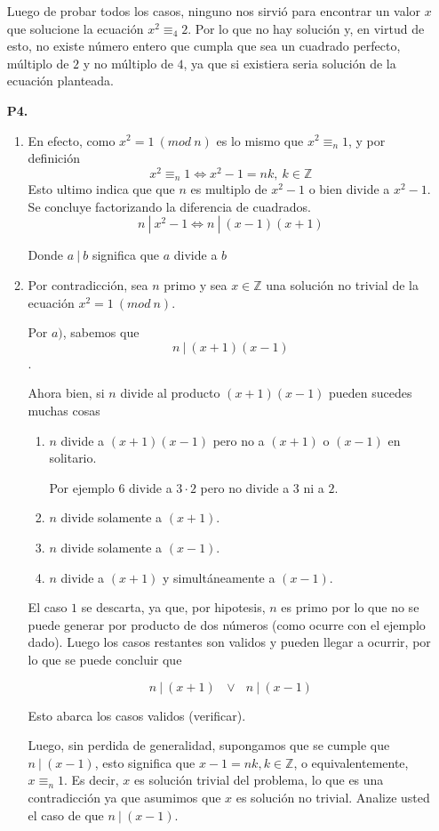\documentclass[letterpaper,11pt]{article}
\newcommand{\Z}{\mathbb Z}
\theoremstyle{plain}
\begin{document}
\begin{enumerate}
Luego de probar todos los casos, ninguno nos sirvió para encontrar un valor $x$ que solucione la ecuación $x^2 \equiv_4 2$. Por lo que no hay solución y, en virtud de esto, no existe número entero que cumpla que sea un cuadrado perfecto, múltiplo de $2$ y no múltiplo de $4$, ya que si existiera seria solución de la ecuación planteada.


\item[\bf P4.] 
\begin{enumerate}
    \item En efecto, como $x^2=1 ~ (mod ~n)$ es lo mismo que $x^2 \equiv_n 1$, y por definición
    $$x^2 \equiv_n 1 \iff x^2-1=nk, ~ k \in \Z$$
    Esto ultimo indica que que $n$ es multiplo de $x^2-1$ o bien divide a $x^2-1$. Se concluye factorizando la diferencia de cuadrados.
    $$n ~|~ x^2-1 \iff n ~|~(x-1)(x+1)$$
     
    Donde $a ~|~ b$ significa que $a$ divide a $b$
     
    \item Por contradicción, sea $n$ primo y sea $x \in \Z$ una solución no trivial de la ecuación $x^2=1 ~ (mod ~n)$. 
    
    Por $a)$, sabemos que $$n ~|~ (x+1)(x-1)$$.
    
    Ahora bien, si $n$ divide al producto $(x+1)(x-1)$ pueden sucedes muchas cosas
    \begin{enumerate}
        \item $n$ divide a $(x+1)(x-1)$ pero no a $(x+1)$ o $(x-1)$ en solitario.
        
        Por ejemplo 6 divide a $3\cdot2$ pero no divide a $3$ ni a $2$.
        \item $n$ divide solamente a $(x+1)$.
        \item $n$ divide solamente a $(x-1)$.
        \item $n$ divide a $(x+1)$ y simultáneamente a $(x-1)$.
    \end{enumerate}
    
    El caso $1$ se descarta, ya que, por hipotesis, $n$ es primo por lo que no se puede generar por producto de dos números (como ocurre con el ejemplo dado). Luego los casos restantes son validos y pueden llegar a ocurrir, por lo que se puede concluir que 
    
    $$ n~ | ~ (x+1) ~~~\lor~~~ n~ | ~ (x-1) $$
    
    Esto abarca los casos validos (verificar).
    
    Luego, sin perdida de generalidad, supongamos que se cumple que $n~ | ~ (x-1)$, esto significa que $x-1=nk, k\in \Z$, o equivalentemente, $x\equiv_n 1$. Es decir, $x$ es solución trivial del problema, lo que es una contradicción ya que asumimos que $x$ es solución no trivial. Analize usted el caso de que $ n~ | ~ (x-1)$.
    

\end{enumerate}
\end{enumerate}
\end{document}
